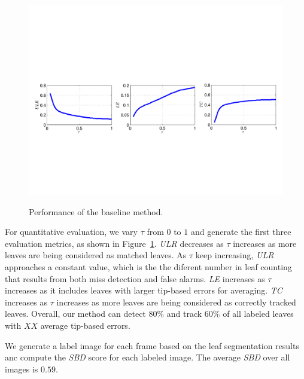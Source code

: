 \begin{figure}
\centering
\includegraphics[width=.98\textwidth]{Figures/performance}\\
\caption{Performance of the baseline method.}
\label{fig:performance}
\end{figure}

For quantitative evaluation, we vary $\tau$ from $0$ to $1$ and generate the first three evaluation metrics, as shown in Figure~\ref{fig:performance}.
{\it{ULR}} decreases as $\tau$ increases as more leaves are being considered as matched leaves.  
As $\tau$ keep increasing, {\it{ULR}} approaches a constant value, which is the the diferent number in leaf counting that results from both miss detection and false alarms. 
{\it{LE}} increases as $\tau$ increases as it includes leaves with larger tip-based errors for averaging. 
{\it{TC}} increases as $\tau$ increases as more leaves are being considered as correctly tracked leaves. 
Overall, our method can detect $80\%$ and track $60\%$ of all labeled leaves with $XX$ average tip-based errors. 

We generate a label image for each frame based on the leaf segmentation results anc compute the {\it{SBD}} score for each labeled image. 
The average {\it{SBD}} over all images is $0.59$.







